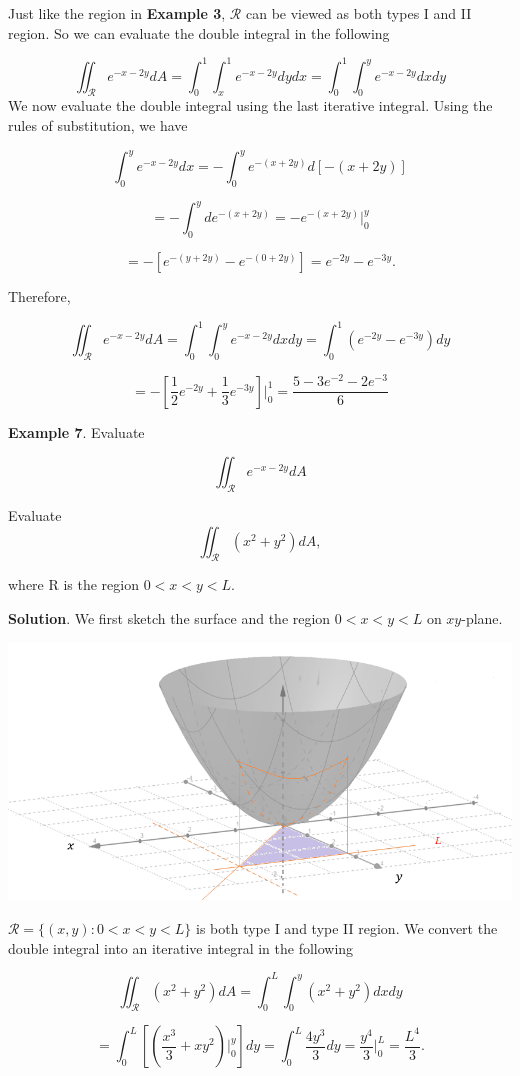 \documentclass[
]{book}
\begin{document}
Just like the region in \textbf{Example 3}, \(\mathcal{R}\) can be viewed as both types I and II region. So we can evaluate the double integral in the following

\[
\iint_{\mathcal{R}} e^{-x-2y}dA = \int_0^1 \int_x^1 e^{-x-2y} dydx = \int_0^1\int_0^y e^{-x-2y} dx dy
\]
We now evaluate the double integral using the last iterative integral. Using the rules of substitution, we have

\[
\int_0^y e^{-x-2y} dx =  -\int_0^ye^{-(x+2y)} d[-(x+2y)] 
\]

\[
= -\int_0^y d e^{-(x+2y)} = -e^{-(x+2y)}\Big|_0^y
\]

\[
=-\left[ e^{-(y+2y)} - e^{-(0+2y)}\right] = e^{-2y}-e^{-3y}.
\]

Therefore,

\[
\iint_{\mathcal{R}} e^{-x-2y}dA= \int_0^1\int_0^y e^{-x-2y} dx dy=\int_0^1(e^{-2y}-e^{-3y})dy
\]

\[
= -\left[ \frac{1}{2}e^{-2y} + \frac{1}{3}e^{-3y} \right]\Big|_0^1=\frac{5-3e^{-2}-2e^{-3}}{6}
\]

\hfill\break

\textbf{Example 7}. Evaluate

\[
\iint_{\mathcal{R}}e^{-x-2y}dA
\]

Evaluate
\[
\iint_{\mathcal{R} }(x^2 + y^2)dA,
\]

where R is the region \(0 < x < y < L\).

\textbf{Solution}. We first sketch the surface and the region \(0 < x < y < L\) on \(xy\)-plane.

\begin{center}\includegraphics[width=0.6\linewidth]{topic06/calcReviewExample8Surface} \end{center}

\(\mathcal{R} = \{(x,y): 0 < x < y < L \}\) is both type I and type II region. We convert the double integral into an iterative integral in the following

\[
\iint_{\mathcal{R}} (x^2+y^2)dA = \int_0^L\int_0^y(x^2+y^2)dxdy
\]

\[
= \int_0^L\left[ (\frac{x^3}{3}+xy^2)\Big|_0^y \right] dy =\int_0^L\frac{4y^3}{3}dy=\frac{y^4}{3}\Big|_0^L =\frac{L^4}{3}.
\]
\end{document}
